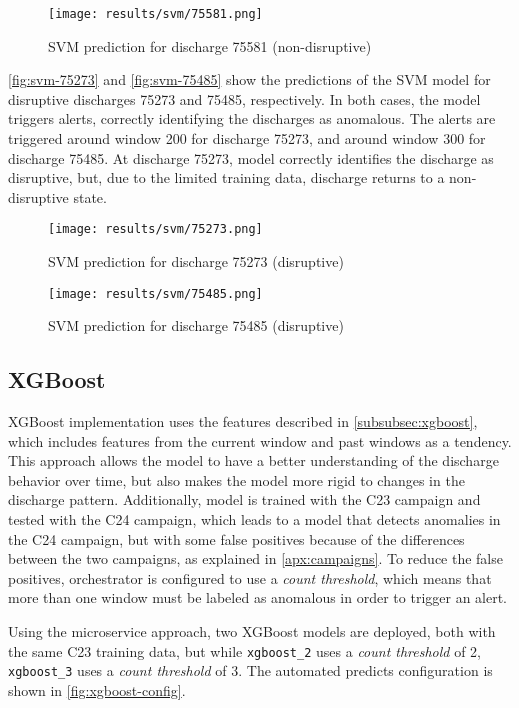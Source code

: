 \begin{figure}[H]
    \centering
    \texttt{[image: results/svm/75581.png]}
    \caption{SVM prediction for discharge 75581 (non-disruptive)}
    \label{fig:svm-75581}
\end{figure}

\autoref{fig:svm-75273} and \autoref{fig:svm-75485} show the predictions of the \ac{SVM} model for disruptive discharges 75273 and 75485, respectively. In both cases, the model triggers alerts, correctly identifying the discharges as anomalous. The alerts are triggered around window 200 for discharge 75273, and around window 300 for discharge 75485. At discharge 75273, model correctly identifies the discharge as disruptive, but, due to the limited training data, discharge returns to a non-disruptive state.  

\begin{figure}[H]
    \centering
    \texttt{[image: results/svm/75273.png]}
    \caption{SVM prediction for discharge 75273 (disruptive)}
    \label{fig:svm-75273}
\end{figure}

\begin{figure}[H]
    \centering
    \texttt{[image: results/svm/75485.png]}
    \caption{SVM prediction for discharge 75485 (disruptive)}
    \label{fig:svm-75485}
\end{figure}

\subsection{XGBoost}

XGBoost implementation uses the features described in \autoref{subsubsec:xgboost}, which includes features from the current window and past windows as a tendency. This approach allows the model to have a better understanding of the discharge behavior over time, but also makes the model more rigid to changes in the discharge pattern. Additionally, model is trained with the C23 campaign and tested with the C24 campaign, which leads to a model that detects anomalies in the C24 campaign, but with some false positives because of the differences between the two campaigns, as explained in \autoref{apx:campaigns}. To reduce the false positives, orchestrator is configured to use a \textit{count threshold}, which means that more than one window must be labeled as anomalous in order to trigger an alert. 

Using the microservice approach, two XGBoost models are deployed, both with the same C23 training data, but while \texttt{xgboost\_2} uses a \textit{count threshold} of 2, \texttt{xgboost\_3} uses a \textit{count threshold} of 3. The automated predicts configuration is shown in \autoref{fig:xgboost-config}.

